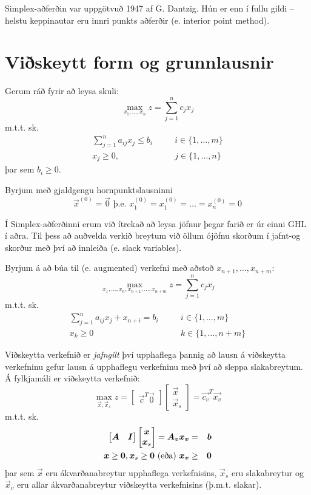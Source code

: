 \begin{aths}
 Simplex-aðferðin var uppgötvuð 1947 af G. Dantzig. Hún er enn í fullu gildi -- helstu keppinautar eru innri punkts aðferðir (e. interior point method).
\end{aths}

\section{Viðskeytt form og grunnlausnir}
Gerum ráð fyrir að leysa skuli:
$$\max_{x_1,\ldots,x_n}  z = \sum_{j=1}^n c_j x_j  $$
m.t.t. sk. 
\begin{eqnarray*}
\sum_{j=1}^n a_{ij} x_j  \le  b_i & & i\in\{1,\ldots,m\}\\
x_j  \ge  0, &\quad & j\in\{1, \ldots, n\}
\end{eqnarray*}
þar sem $b_i \ge 0$.

Byrjum með gjaldgengu hornpunktslausninni
$$\vec{x}^{(0)} = \vec{0} \mbox{ þ.e. } x_1^{(0)}=x_1^{(0)}=\ldots=x_n^{(0)}=0$$

Í Simplex-aðferðinni erum við ítrekað að leysa jöfnur þegar farið er úr einni GHL í aðra. Til þess að auðvelda verkið breytum við öllum ójöfnu skorðum í jafnt-og skorður með því að innleiða  (e. slack variables).
 
Byrjum á að búa til  (e. augmented) verkefni með aðstoð  $x_{n+1},\ldots, x_{n+m}$:
$$ \max_{x_1,\ldots,x_n, x_{n+1},\ldots, x_{n+m}}  z = \sum_{j=1}^n c_j x_j  $$
m.t.t. sk.
\begin{eqnarray*}
\sum_{j=1}^n a_{ij} x_j + x_{n+i}  = b_i &\quad& i\in\{1,\ldots,m\}\\
x_k  \ge  0 &&  k\in\{1, \ldots, n+m\}
\end{eqnarray*}

Viðskeytta verkefnið er \emph{jafngilt} því upphaflega þannig að lausn á við\-skeytta verkefninu gefur lausn á upphaflegu verkefninu með því að sleppa slakabreytum. Á fylkjamáli er viðskeytta verkefnið:
$$\max_{\vec{x},\vec{x}_s}  z = \begin{bmatrix}\vec{c}^{T} 
  \vec{0}\end{bmatrix}\begin{bmatrix}\vec{x}\\\vec{x}_s\end{bmatrix}
  = \vec{c_v}^T\vec{x_v} $$
m.t.t. sk.
\begin{eqnarray*}
 \begin{bmatrix}{\mbox{\boldmath$A$}} &
  {\mbox{\boldmath$I$}}\end{bmatrix}\begin{bmatrix}{\mbox{\boldmath$x$}}\\ {\mbox{\boldmath$x$}}_s\end{bmatrix} = {\mbox{\boldmath$A_v$}}{\mbox{\boldmath$x_v$}}  &=&  {\mbox{\boldmath$b$}} \\
 {\mbox{\boldmath$x$}} \ge  {\mbox{\boldmath$0$}}, {\mbox{\boldmath$x$}}_s \ge  {\mbox{\boldmath$0$}} \mbox{ (eða) }
  {\mbox{\boldmath$x_v$}} &\ge& {\mbox{\boldmath$0$}}
\end{eqnarray*}
þar sem $\vec{x}$ eru ákvarðanabreytur upphaflega verkefnisins, $\vec{x}_s$ eru slaka\-breytur og $\vec{x}_v$ eru allar ákvarðanabreytur viðskeytta verkefnisins (þ.m.t. slakar).


